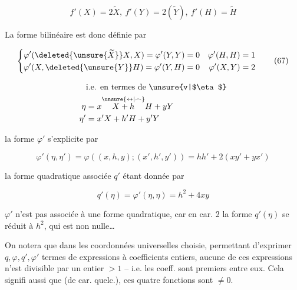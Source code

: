 \[
f'(X)=2\widetilde X,\ f'(Y)=2(\widetilde Y),\ f'(H)=\widetilde H \tag*{(66)}
\]

La forme bilinéaire   est donc définie par

\[
\left\{\begin{aligned}
\varphi'(\deleted{\unsure{\widetilde X}}X,X)=\varphi'(Y,Y)&=0 &\varphi'(H,H)&=1\\
\varphi'(X,\deleted{\unsure{Y}}H)=\varphi'(Y,H)&=0 &\varphi'(X,Y)&=2
\end{aligned}\right. \tag*{(67)}
\]

\[
\begin{aligned}
&\text{i.e. en termes de \unsure{v|$\eta$}}\\
\eta&=x\overset{\unsure{\leftrightarrow|\frown}}{X+h}H+yY\\
\eta'&=x'X+h'H+y'Y
\end{aligned}
\]

la forme $\varphi'$ s'explicite par

\[
\varphi'(\eta,\eta')=\varphi((x,h,y);(x',h',y'))=hh'+2(xy'+yx') \tag*{(68)}
\]

la forme quadratique associée $q'$ étant donnée par

\[
q'(\eta)=\varphi'(\eta,\eta)=h^2+4xy \tag*{(69)}
\]

  $\varphi'$ n'est pas associée à une forme quadratique,  car en car. 2 la forme $q'(\eta)$ se réduit à $h^2$, qui est non nulle\ldots

On notera que dans les coordonnées universelles choisie, permettant d'exprimer $q,\varphi,q',\varphi'$  termes de  expressions  à coefficients entiers, aucune de ces expressions n'est divisible par un entier $>1$ -- i.e. les coeff. sont premiers entre eux. Cela signifi aussi que   (de car. quelc.), ces quatre fonctions sont $\ne0$.

